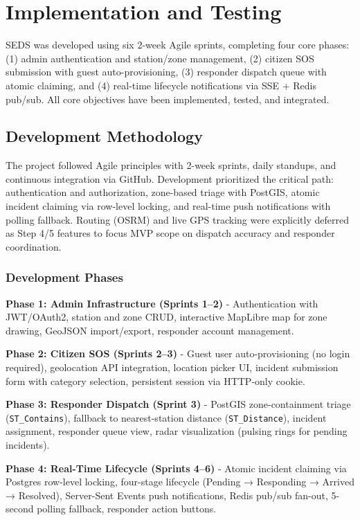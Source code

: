\chapter{Implementation and Testing}

SEDS was developed using six 2-week Agile sprints, completing four core phases: (1) admin authentication and station/zone management, (2) citizen SOS submission with guest auto-provisioning, (3) responder dispatch queue with atomic claiming, and (4) real-time lifecycle notifications via SSE + Redis pub/sub. All core objectives have been implemented, tested, and integrated.

\section{Development Methodology}

The project followed Agile principles with 2-week sprints, daily standups, and continuous integration via GitHub. Development prioritized the critical path: authentication and authorization, zone-based triage with PostGIS, atomic incident claiming via row-level locking, and real-time push notifications with polling fallback. Routing (OSRM) and live GPS tracking were explicitly deferred as Step 4/5 features to focus MVP scope on dispatch accuracy and responder coordination.

\subsection{Development Phases}

\textbf{Phase 1: Admin Infrastructure (Sprints 1--2)} - Authentication with JWT/OAuth2, station and zone CRUD, interactive MapLibre map for zone drawing, GeoJSON import/export, responder account management.

\textbf{Phase 2: Citizen SOS (Sprints 2--3)} - Guest user auto-provisioning (no login required), geolocation API integration, location picker UI, incident submission form with category selection, persistent session via HTTP-only cookie.

\textbf{Phase 3: Responder Dispatch (Sprint 3)} - PostGIS zone-containment triage (\texttt{ST\_Contains}), fallback to nearest-station distance (\texttt{ST\_Distance}), incident assignment, responder queue view, radar visualization (pulsing rings for pending incidents).

\textbf{Phase 4: Real-Time Lifecycle (Sprints 4--6)} - Atomic incident claiming via Postgres row-level locking, four-stage lifecycle (Pending → Responding → Arrived → Resolved), Server-Sent Events push notifications, Redis pub/sub fan-out, 5-second polling fallback, responder action buttons.

